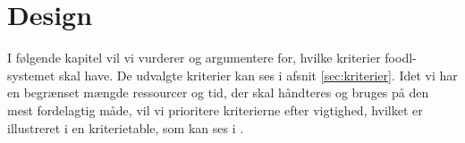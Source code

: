 \chapter{Design}
\label{chap:design}
I følgende kapitel vil vi vurderer og argumentere for, hvilke kriterier foodl-systemet skal have. De udvalgte kriterier kan ses i afsnit \ref{sec:kriterier}. Idet vi har en begrænset mængde ressourcer og tid, der skal håndteres og bruges på den mest fordelagtig måde, vil vi prioritere kriterierne efter vigtighed, hvilket er illustreret i en kriterietable, som kan ses i .



